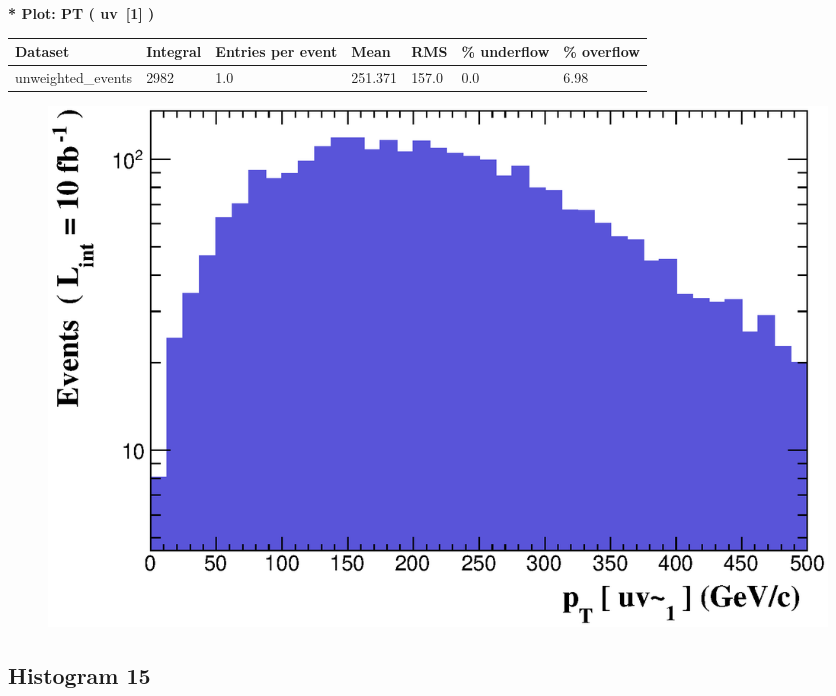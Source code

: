 \documentclass[a4paper, 10pt]{article}
\begin{document}
\textbf{* Plot: PT ( uv~[1] ) }\\
   \begin{table}[H]
  \begin{center}
    \begin{tabular}{|m{23.0mm}|m{23.0mm}|m{18.0mm}|m{19.0mm}|m{19.0mm}|m{19.0mm}|m{19.0mm}|}
      \hline
      {\cellcolor{yellow}         Dataset}& {\cellcolor{yellow}         Integral}& {\cellcolor{yellow}         Entries per event}& {\cellcolor{yellow}         Mean}& {\cellcolor{yellow}         RMS}& {\cellcolor{yellow}         \% underflow}& {\cellcolor{yellow}         \% overflow}\\
      \hline
      {\cellcolor{white}         unweighted\_events}& {\cellcolor{white}         2982}& {\cellcolor{white}         1.0}& {\cellcolor{white}         251.371}& {\cellcolor{white}         157.0}& {\cellcolor{orange}         0.0}& {\cellcolor{orange}         6.98}\\
\hline
    \end{tabular}
  \end{center}
\end{table}

\begin{figure}[H]
  \begin{center}
    \includegraphics[scale=0.45]{selection_13.eps}\\
\caption{   }
  \end{center}
\end{figure}
      \newpage
\subsection{ Histogram 15}
\end{document}
